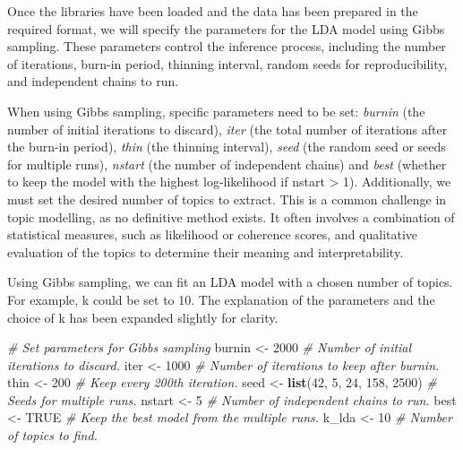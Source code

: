 \documentclass[
]{book}
\newenvironment{Shaded}{\begin{snugshade}}{\end{snugshade}}
\newcommand{\CommentTok}[1]{\textcolor[rgb]{0.56,0.35,0.01}{\textit{#1}}}
\newcommand{\ConstantTok}[1]{\textcolor[rgb]{0.56,0.35,0.01}{#1}}
\newcommand{\DecValTok}[1]{\textcolor[rgb]{0.00,0.00,0.81}{#1}}
\newcommand{\FunctionTok}[1]{\textcolor[rgb]{0.13,0.29,0.53}{\textbf{#1}}}
\newcommand{\NormalTok}[1]{#1}
\newcommand{\OtherTok}[1]{\textcolor[rgb]{0.56,0.35,0.01}{#1}}
\begin{document}
Once the libraries have been loaded and the data has been prepared in the required format, we will specify the parameters for the LDA model using Gibbs sampling.
These parameters control the inference process, including the number of iterations, burn-in period, thinning interval, random seeds for reproducibility, and independent chains to run.

When using Gibbs sampling, specific parameters need to be set: \emph{burnin} (the number of initial iterations to discard), \emph{iter} (the total number of iterations after the burn-in period), \emph{thin} (the thinning interval), \emph{seed} (the random seed or seeds for multiple runs), \emph{nstart} (the number of independent chains) and \emph{best} (whether to keep the model with the highest log-likelihood if nstart \textgreater{} 1).
Additionally, we must set the desired number of topics to extract.
This is a common challenge in topic modelling, as no definitive method exists.
It often involves a combination of statistical measures, such as likelihood or coherence scores, and qualitative evaluation of the topics to determine their meaning and interpretability.

Using Gibbs sampling, we can fit an LDA model with a chosen number of topics.
For example, k could be set to 10.
The explanation of the parameters and the choice of k has been expanded slightly for clarity.

\begin{Shaded}
\begin{Highlighting}[]
\CommentTok{\# Set parameters for Gibbs sampling}
\NormalTok{burnin }\OtherTok{\textless{}{-}} \DecValTok{2000}  \CommentTok{\# Number of initial iterations to discard.}
\NormalTok{iter }\OtherTok{\textless{}{-}} \DecValTok{1000}  \CommentTok{\# Number of iterations to keep after burnin.}
\NormalTok{thin }\OtherTok{\textless{}{-}} \DecValTok{200}  \CommentTok{\# Keep every 200th iteration.}
\NormalTok{seed }\OtherTok{\textless{}{-}} \FunctionTok{list}\NormalTok{(}\DecValTok{42}\NormalTok{, }\DecValTok{5}\NormalTok{, }\DecValTok{24}\NormalTok{, }\DecValTok{158}\NormalTok{, }\DecValTok{2500}\NormalTok{)  }\CommentTok{\# Seeds for multiple runs. }
\NormalTok{nstart }\OtherTok{\textless{}{-}} \DecValTok{5}  \CommentTok{\# Number of independent chains to run.}
\NormalTok{best }\OtherTok{\textless{}{-}} \ConstantTok{TRUE}  \CommentTok{\# Keep the best model from the multiple runs. }
\NormalTok{k\_lda }\OtherTok{\textless{}{-}} \DecValTok{10}  \CommentTok{\# Number of topics to find. }
\end{Highlighting}
\end{Shaded}
\end{document}
